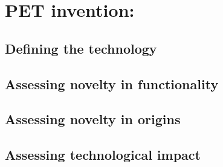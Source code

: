\section{PET invention: }
\subsection{Defining the technology}

\subsection{Assessing novelty in functionality}

\subsection{Assessing novelty in origins}

\subsection{Assessing technological impact}